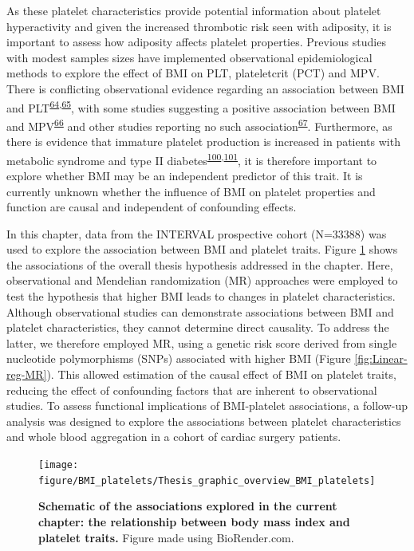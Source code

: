 \documentclass[11pt,twoside]{bristolthesis}
\begin{document}
As these platelet characteristics provide potential information about platelet hyperactivity and given the increased thrombotic risk seen with adiposity, it is important to assess how adiposity affects platelet properties. Previous studies with modest samples sizes have implemented observational epidemiological methods to explore the effect of BMI on PLT, plateletcrit (PCT) and MPV. There is conflicting observational evidence regarding an association between BMI and PLT\textsuperscript{\protect\hyperlink{ref-Furuncuoglu2016}{64},\protect\hyperlink{ref-Han2018a}{65}}, with some studies suggesting a positive association between BMI and MPV\textsuperscript{\protect\hyperlink{ref-Coban2005}{66}} and other studies reporting no such association\textsuperscript{\protect\hyperlink{ref-Heffron2018}{67}}. Furthermore, as there is evidence that immature platelet production is increased in patients with metabolic syndrome and type II diabetes\textsuperscript{\protect\hyperlink{ref-Vaduganathan2008a}{100},\protect\hyperlink{ref-Mijovic2015a}{101}}, it is therefore important to explore whether BMI may be an independent predictor of this trait. It is currently unknown whether the influence of BMI on platelet properties and function are causal and independent of confounding effects.

In this chapter, data from the INTERVAL prospective cohort (N=33388) was used to explore the association between BMI and platelet traits. Figure \ref{fig:BMI-platelet-overview} shows the associations of the overall thesis hypothesis addressed in the chapter. Here, observational and Mendelian randomization (MR) approaches were employed to test the hypothesis that higher BMI leads to changes in platelet characteristics. Although observational studies can demonstrate associations between BMI and platelet characteristics, they cannot determine direct causality. To address the latter, we therefore employed MR, using a genetic risk score derived from single nucleotide polymorphisms (SNPs) associated with higher BMI (Figure \ref{fig:Linear-reg-MR}). This allowed estimation of the causal effect of BMI on platelet traits, reducing the effect of confounding factors that are inherent to observational studies. To assess functional implications of BMI-platelet associations, a follow-up analysis was designed to explore the associations between platelet characteristics and whole blood aggregation in a cohort of cardiac surgery patients.



\begin{figure}

{\centering \texttt{[image: figure/BMI\_platelets/Thesis\_graphic\_overview\_BMI\_platelets]} 

}

\caption[Schematic of the associations explored in the current chapter: the relationship between body mass index and platelet traits.]{\textbf{Schematic of the associations explored in the current chapter: the relationship between body mass index and platelet traits.} Figure made using BioRender.com.}\label{fig:BMI-platelet-overview}
\end{figure}
\end{document}
